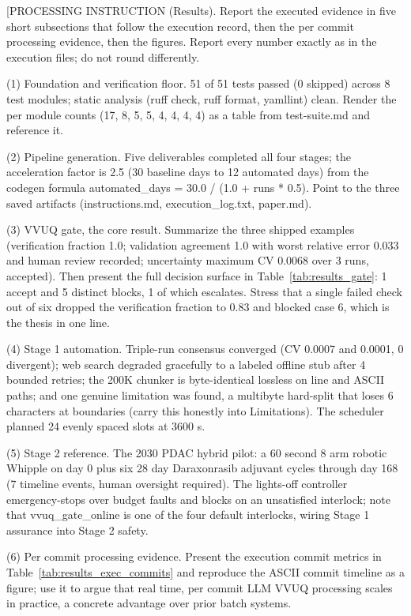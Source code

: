 
[PROCESSING INSTRUCTION (Results). Report the executed evidence in five
short subsections that follow the execution record, then the per commit
processing evidence, then the figures. Report every number exactly as in
the execution files; do not round differently.

(1) Foundation and verification floor. 51 of 51 tests passed (0 skipped)
across 8 test modules; static analysis (ruff check, ruff format, yamllint)
clean. Render the per module counts (17, 8, 5, 5, 4, 4, 4, 4) as a table
from test-suite.md and reference it.

(2) Pipeline generation. Five deliverables completed all four stages; the
acceleration factor is 2.5 (30 baseline days to 12 automated days) from
the codegen formula automated\_days = 30.0 / (1.0 + runs * 0.5). Point to
the three saved artifacts (instructions.md, execution\_log.txt, paper.md).

(3) VVUQ gate, the core result. Summarize the three shipped examples
(verification fraction 1.0; validation agreement 1.0 with worst relative
error 0.033 and human review recorded; uncertainty maximum CV 0.0068 over
3 runs, accepted). Then present the full decision surface in
Table~\ref{tab:results_gate}: 1 accept and 5 distinct blocks, 1 of which
escalates. Stress that a single failed check out of six dropped the
verification fraction to 0.83 and blocked case 6, which is the thesis in
one line.

(4) Stage 1 automation. Triple-run consensus converged (CV 0.0007 and
0.0001, 0 divergent); web search degraded gracefully to a labeled offline
stub after 4 bounded retries; the 200K chunker is byte-identical lossless
on line and ASCII paths; and one genuine limitation was found, a multibyte
hard-split that loses 6 characters at boundaries (carry this honestly into
Limitations). The scheduler planned 24 evenly spaced slots at 3600 s.

(5) Stage 2 reference. The 2030 PDAC hybrid pilot: a 60 second 8 arm
robotic Whipple on day 0 plus six 28 day Daraxonrasib adjuvant cycles
through day 168 (7 timeline events, human oversight required). The
lights-off controller emergency-stops over budget faults and blocks on an
unsatisfied interlock; note that vvuq\_gate\_online is one of the four
default interlocks, wiring Stage 1 assurance into Stage 2 safety.

(6) Per commit processing evidence. Present the execution commit metrics
in Table~\ref{tab:results_exec_commits} and reproduce the ASCII commit
timeline as a figure; use it to argue that real time, per commit LLM VVUQ
processing scales in practice, a concrete advantage over prior batch
systems.


